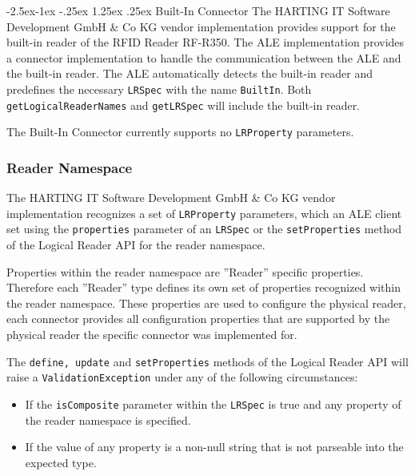 \documentclass[11pt,a4paper,oneside]{article}
\makeatletter
\newif\ifincluderc
\renewcommand\paragraph{\@startsection{paragraph}{4}{\z@}%
            {-2.5ex\@plus -1ex \@minus -.25ex}%
            {1.25ex \@plus .25ex}%
            {\normalfont\normalsize\bfseries}}
\makeatother
\begin{document}
\paragraph{Built-In Connector} \label{par:builtin}
The HARTING IT Software Development GmbH \& Co KG vendor implementation provides support for the built-in reader of the RFID Reader RF-R350. The ALE implementation provides a connector implementation to handle the communication between the ALE and the built-in reader. The ALE automatically detects the built-in reader and predefines the necessary \texttt{LRSpec} with the name \texttt{BuiltIn}. Both \texttt{getLogicalReaderNames} and \texttt{getLRSpec} will include the built-in reader.

The Built-In Connector currently supports no \texttt{LRProperty} parameters.


\subsubsection{Reader Namespace}
The HARTING IT Software Development GmbH \& Co KG vendor implementation recognizes a set of \texttt{LRProperty} parameters, which an ALE client set using the \texttt{properties} parameter of an \texttt{LRSpec} or the \texttt{setProperties} method of the Logical Reader API for the reader namespace.

Properties within the reader namespace are ''Reader'' specific properties. Therefore each ''Reader'' type defines its own set of properties recognized within the reader namespace. These properties are used to configure the physical reader, each connector provides all configuration properties that are supported by the physical reader the specific connector was implemented for.

\ifincluderc
A complete set of the properties within the reader namespace could be obtained by a client using the Reader Configuration API (see section \ref{subsec:ALEReader}).
\fi

The \texttt{define, update} and \texttt{setProperties} methods of the Logical Reader API will raise a \texttt{ValidationException} under any of the following circumstances:

\begin{itemize}
\item	If the \texttt{isComposite} parameter within the \texttt{LRSpec} is true and any property of the reader namespace is specified.
\item	If the value of any property is a non-null string that is not parseable into the expected type.
\end{itemize}
\end{document}
